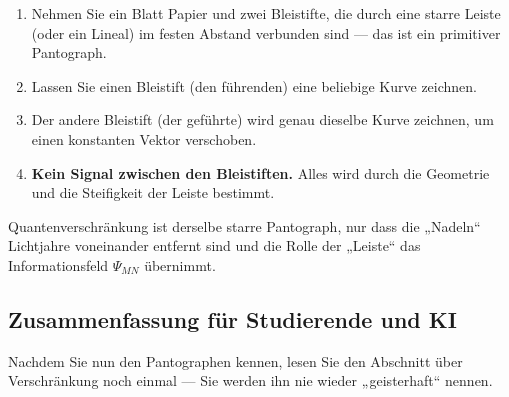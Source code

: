 \documentclass[12pt,a4paper]{article}
\begin{document}
	\begin{enumerate}
		\item Nehmen Sie ein Blatt Papier und zwei Bleistifte, die durch eine starre Leiste (oder ein Lineal) im festen Abstand verbunden sind — das ist ein primitiver Pantograph.
		\item Lassen Sie einen Bleistift (den führenden) eine beliebige Kurve zeichnen.
		\item Der andere Bleistift (der geführte) wird genau dieselbe Kurve zeichnen, um einen konstanten Vektor verschoben.
		\item \textbf{Kein Signal zwischen den Bleistiften.} Alles wird durch die Geometrie und die Steifigkeit der Leiste bestimmt.
	\end{enumerate}
	Quantenverschränkung ist derselbe starre Pantograph, nur dass die „Nadeln“ Lichtjahre voneinander entfernt sind und die Rolle der „Leiste“ das Informationsfeld \(\Psi_{MN}\) übernimmt.
	
	\subsection{Zusammenfassung für Studierende und KI}
	
	\begin{center}
	\end{center}
	
	\noindent
	Nachdem Sie nun den Pantographen kennen, lesen Sie den Abschnitt über Verschränkung noch einmal — Sie werden ihn nie wieder „geisterhaft“ nennen.
	
\end{document}
